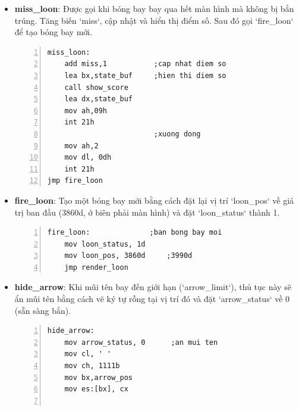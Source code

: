 \documentclass[12pt,a4paper,openany,oneside]{report}
\begin{document}
\begin{itemize}
\begin{lstlisting}[caption={Mã nguồn nhãn spaceKey/fire_arrow}, basicstyle=\ttfamily\footnotesize, numbers=left, numberstyle=\tiny, stepnumber=1, numbersep=5pt, breaklines=true, language={[x86masm]Assembler}]
fire_arrow:              ;dat vi tri mui ten tai vi tri nguoi choi
    mov dx, player_pos   ;de mui ten ban tu vi tri nguoi choi
    mov arrow_pos, dx
    
    mov dx,player_pos     ;khi ban mui ten, no cung dat gioi han
    mov arrow_limit, dx   ;cua mui ten, noi ma no se bi an
    add arrow_limit, 22d  ;150
    
    mov arrow_status, 1d   ;dat trang thai mui ten,ngan chan ban nhieu lan
    jmp inside_loop        
\end{lstlisting} 
    \item \textbf{miss\_loon}: Được gọi khi bóng bay bay qua hết màn hình mà không bị bắn trúng. Tăng biến `miss`, cập nhật và hiển thị điểm số. Sau đó gọi `fire_loon` để tạo bóng bay mới.
\begin{lstlisting}[caption={Mã nguồn nhãn miss_loon}, basicstyle=\ttfamily\footnotesize, numbers=left, numberstyle=\tiny, stepnumber=1, numbersep=5pt, breaklines=true, language={[x86masm]Assembler}]
miss_loon:
    add miss,1           ;cap nhat diem so
    lea bx,state_buf     ;hien thi diem so
    call show_score 
    lea dx,state_buf
    mov ah,09h
    int 21h
                         ;xuong dong
    mov ah,2
    mov dl, 0dh
    int 21h
jmp fire_loon
\end{lstlisting} 
    \item \textbf{fire\_loon}: Tạo một bóng bay mới bằng cách đặt lại vị trí `loon_pos` về giá trị ban đầu (3860d, ở biên phải màn hình) và đặt `loon_status` thành 1.
\begin{lstlisting}[caption={Mã nguồn nhãn fire_loon}, basicstyle=\ttfamily\footnotesize, numbers=left, numberstyle=\tiny, stepnumber=1, numbersep=5pt, breaklines=true, language={[x86masm]Assembler}]
fire_loon:              ;ban bong bay moi
    mov loon_status, 1d
    mov loon_pos, 3860d     ;3990d
    jmp render_loon
\end{lstlisting} 
    \item \textbf{hide\_arrow}: Khi mũi tên bay đến giới hạn (`arrow_limit`), thủ tục này sẽ ẩn mũi tên bằng cách vẽ ký tự rỗng tại vị trí đó và đặt `arrow_status` về 0 (sẵn sàng bắn).
\begin{lstlisting}[caption={Mã nguồn nhãn hide_arrow}, basicstyle=\ttfamily\footnotesize, numbers=left, numberstyle=\tiny, stepnumber=1, numbersep=5pt, breaklines=true, language={[x86masm]Assembler}]
hide_arrow:
    mov arrow_status, 0      ;an mui ten
    mov cl, ' '
    mov ch, 1111b
    mov bx,arrow_pos 
    mov es:[bx], cx
    

\end{lstlisting}
\end{itemize}
\end{document}
